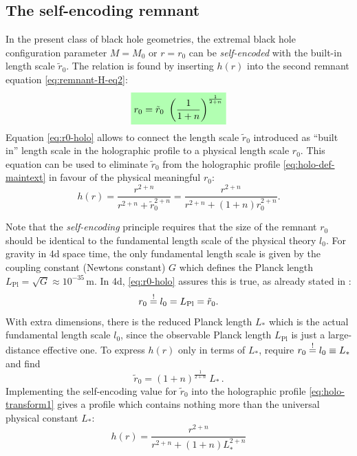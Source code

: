 \documentclass[12pt,a4paper]{report}
\numberwithin{equation}{chapter}
\newcommand{\highlight}[1]{%
  \colorbox{green!30}{$\displaystyle#1$}}
\begin{document}
\clearpage
\subsection{The self-encoding remnant}
In the present class of black hole geometries, the extremal black hole configuration parameter $M=M_0$ or $r=r_0$ can be \emph{self-encoded} with the built-in length scale $\tilde r_0$. The relation is found by inserting $h(r)$ into the second remnant equation \eqref{eq:remnant-H-eq2}:%
%
\begin{equation}\label{eq:r0-holo}
\highlight{r_0 = \tilde r_0~\left( \frac 1{1+n} \right)^{\frac 1{2+n}}}
\end{equation}
%
Equation \eqref{eq:r0-holo} allows to connect the length scale $\tilde r_0$ introduced as ``built in'' length scale in the holographic profile to a physical length scale $r_0$. This equation can be used to eliminate $\tilde r_0$ from the holographic profile \eqref{eq:holo-def-maintext} in favour of the physical meaningful $r_0$:
\begin{equation}\label{eq:holo-transform1}
h(r) = \frac{r^{2+n}}{r^{2+n} + \tilde r_0^{2+n}}
= \frac{r^{2+n}}{r^{2+n} + (1+n) r_0^{2+n}}.
\end{equation}

Note that the \emph{self-encoding} principle requires that the size of the remnant $r_0$ should be identical to the fundamental length scale of the physical theory $l_0$. For gravity in 4d space time, the only fundamental length scale is given by the coupling constant (Newtons constant) $G$ which defines the Planck length $L_\text{Pl} = \sqrt{G} \approx 10^{-35}\,$m. In 4d, \eqref{eq:r0-holo} assures this is true, as already stated in \cite{NS2013}:
\begin{equation}
r_0 \stackrel{!}{=} l_0 = L_\text{Pl} = \tilde r_0.
\end{equation}
%
With extra dimensions, there is the reduced Planck length $L_*$ which is the actual fundamental length scale $l_0$, since the observable Planck length $L_\text{Pl}$ is just a large-distance effective one. To express $h(r)$ only in terms of $L_*$, require $r_0 \stackrel{!}{=} l_0 \equiv L_*$ and find
%
\begin{equation}
\label{eq:rtilde0-holo}
\tilde r_0 = (1+n)^{\frac 1{2+n}}~L_* \,.
\end{equation}
%
Implementing the self-encoding value for $\tilde r_0$ into the holographic profile \eqref{eq:holo-transform1} gives a profile which contains nothing more than the universal physical constant $L_*$:
\begin{equation}\label{eq:holo-without-rtilde}
h(r) = \frac{r^{2+n}}{r^{2+n} + (1+n) L_*^{2+n}}
\end{equation}
\end{document}
